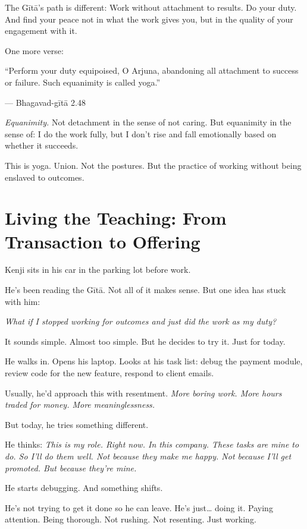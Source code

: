 \documentclass[11pt,twoside]{book}
\begin{document}
The Gītā's path is different: Work without attachment to results. Do your duty. And find your peace not in what the work gives you, but in the quality of your engagement with it.

One more verse:

\begin{pullquote}
``Perform your duty equipoised, O Arjuna, abandoning all attachment to success or failure. Such equanimity is called yoga.''

--- Bhagavad-gītā 2.48
\end{pullquote}

\emph{Equanimity.} Not detachment in the sense of not caring. But equanimity in the sense of: I do the work fully, but I don't rise and fall emotionally based on whether it succeeds.

This is yoga. Union. Not the postures. But the practice of working without being enslaved to outcomes.

\section*{Living the Teaching: From Transaction to Offering}

Kenji sits in his car in the parking lot before work.

He's been reading the Gītā. Not all of it makes sense. But one idea has stuck with him:

\emph{What if I stopped working for outcomes and just did the work as my duty?}

It sounds simple. Almost too simple. But he decides to try it. Just for today.

He walks in. Opens his laptop. Looks at his task list: debug the payment module, review code for the new feature, respond to client emails.

Usually, he'd approach this with resentment. \emph{More boring work. More hours traded for money. More meaninglessness.}

But today, he tries something different.

He thinks: \emph{This is my role. Right now. In this company. These tasks are mine to do. So I'll do them well. Not because they make me happy. Not because I'll get promoted. But because they're mine.}

He starts debugging. And something shifts.

He's not trying to get it done so he can leave. He's just\ldots{} doing it. Paying attention. Being thorough. Not rushing. Not resenting. Just working.
\end{document}
